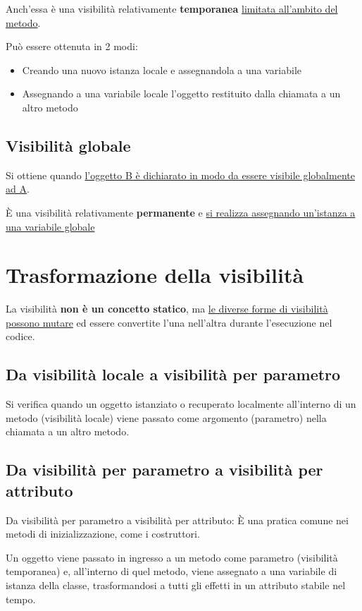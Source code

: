 Anch'essa è una visibilità relativamente \textbf{temporanea} \uline{limitata all'ambito del metodo}.

Può essere ottenuta in 2 modi:
\begin{itemize}
    \item Creando una nuovo istanza locale e assegnandola a una variabile
    \item Assegnando a una variabile locale l'oggetto restituito dalla chiamata a un altro metodo
\end{itemize}

\subsection{Visibilità globale}
Si ottiene quando \uline{l'oggetto B è dichiarato in modo da essere visibile globalmente ad A}.

È una visibilità relativamente \textbf{permanente} e \uline{si realizza assegnando un'istanza a una variabile globale}

\section{Trasformazione della visibilità}
La visibilità \textbf{non è un concetto statico}, ma \uline{le diverse forme di visibilità possono mutare} ed essere convertite l'una nell'altra durante l'esecuzione nel codice.

\subsection{Da visibilità locale a visibilità per parametro}
Si verifica quando un oggetto istanziato o recuperato localmente all'interno di un metodo (visibilità locale) viene passato come argomento (parametro) nella chiamata a un altro metodo.

\subsection{Da visibilità per parametro a visibilità per attributo}
Da visibilità per parametro a visibilità per attributo: È una pratica comune nei metodi di inizializzazione, come i costruttori. 

Un oggetto viene passato in ingresso a un metodo come parametro (visibilità temporanea) e, all'interno di quel metodo, viene assegnato a una variabile di istanza della classe, trasformandosi a tutti gli effetti in un attributo stabile nel tempo.